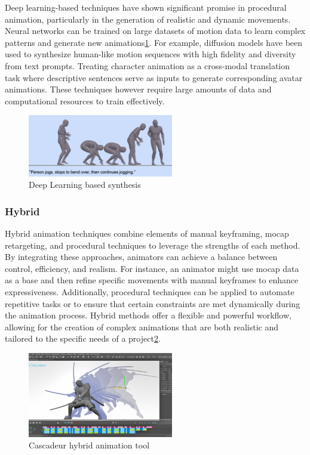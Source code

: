 \documentclass[../../main.tex]{subfiles}
\begin{document}
Deep learning-based techniques have shown significant promise in procedural animation, particularly in the generation of realistic and dynamic movements. Neural networks can be trained on large datasets of motion data to learn complex patterns and generate new animations\ref{fig:deep_learning_synthesis}. For example, diffusion models\cite{zhang2022motiondiffuse} have been used to synthesize human-like motion sequences with high fidelity and diversity from text prompts. Treating character animation as a cross-modal translation task where descriptive sentences serve as inputs to generate corresponding avatar animations. These techniques however require large amounts of data and computational resources to train effectively.

\begin{figure}
  \centering \includegraphics[width = 2.5in]{chapters/background_work/images/deep_learning_synthesis.png}
  \caption{Deep Learning based synthesis\cite{guo2022generating}}
  \label{fig:deep_learning_synthesis}
\end{figure}

\subsubsection{Hybrid}

Hybrid animation techniques combine elements of manual keyframing, mocap retargeting, and procedural techniques to leverage the strengths of each method. By integrating these approaches, animators can achieve a balance between control, efficiency, and realism. For instance, an animator might use mocap data as a base and then refine specific movements with manual keyframes to enhance expressiveness. Additionally, procedural techniques can be applied to automate repetitive tasks or to ensure that certain constraints are met dynamically during the animation process. Hybrid methods offer a flexible and powerful workflow, allowing for the creation of complex animations that are both realistic and tailored to the specific needs of a project\ref{fig:cascadeur}.

\begin{figure}
  \centering \includegraphics[width = 2.5in]{chapters/background_work/images/cascadeur.png}
  \caption{Cascadeur hybrid animation tool}
  \label{fig:cascadeur}
\end{figure}
\end{document}
